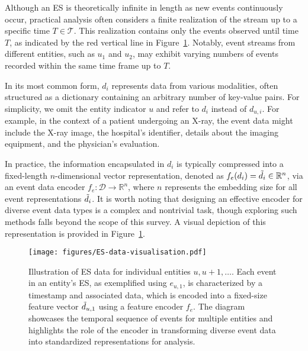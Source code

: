 \documentclass[twoside,11pt]{article}
\begin{document}
Although an ES is theoretically infinite in length as new events continuously occur, practical analysis often considers a finite realization of the stream up to a specific time $T \in \mathcal{T}$. This realization contains only the events observed until time $T$, as indicated by the red vertical line in Figure~\ref{fig:es-data-vis}. Notably, event streams from different entities, such as $u_1$ and $u_2$, may exhibit varying numbers of events recorded within the same time frame up to $T$.

In its most common form, $d_i$ represents data from various modalities, often structured as a dictionary containing an arbitrary number of key-value pairs. For simplicity, we omit the entity indicator $u$ and refer to $d_i$ instead of $d_{u,i}$. For example, in the context of a patient undergoing an X-ray, the event data might include the X-ray image, the hospital's identifier, details about the imaging equipment, and the physician's evaluation.

In practice, the information encapsulated in $d_i$ is typically compressed into a fixed-length $n$-dimensional vector representation, denoted as $f_e(d_i) = \Tilde{d}_i \in \mathbb{R}^n$, via an event data encoder $f_e: \mathcal{D} \rightarrow \mathbb{R}^n$, where $n$ represents the embedding size for all event representations $\Tilde{d}_i$. It is worth noting that designing an effective encoder for diverse event data types is a complex and nontrivial task, though exploring such methods falls beyond the scope of this survey. A visual depiction of this representation is provided in Figure~\ref{fig:es-data-vis}.

\begin{figure}[ht]
    \centering
    \texttt{[image: figures/ES-data-visualisation.pdf]}    
    \caption{Illustration of ES data for individual entities $u, u+1, \ldots$. Each event in an entity’s ES, as exemplified using $e_{u,1}$, is characterized by a timestamp and associated data, which is encoded into a fixed-size feature vector $\Tilde{d}_
    {u,1}$ using a feature encoder $f_e$. The diagram showcases the temporal sequence of events for multiple entities and highlights the role of the encoder in transforming diverse event data into standardized representations for analysis.}
    \label{fig:es-data-vis}
\end{figure}
\end{document}
